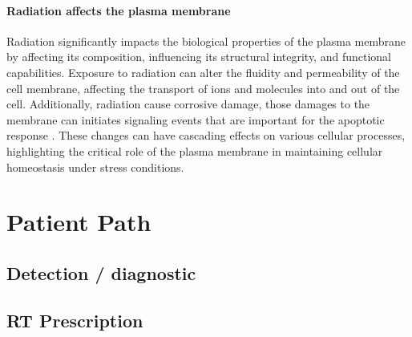 \paragraph{Radiation affects the plasma membrane}
Radiation significantly impacts the biological properties of the plasma membrane by affecting its composition, influencing its structural integrity, and functional capabilities.
Exposure to radiation can alter the fluidity and permeability of the cell membrane, affecting the transport of ions and molecules into and out of the cell.
Additionally, radiation cause corrosive damage, those damages to the membrane can initiates signaling events that are important for the apoptotic response \cite{CohenJonathan1999}.
These changes can have cascading effects on various cellular processes, highlighting the critical role of the plasma membrane in maintaining cellular homeostasis under stress conditions.





\section{Patient Path}

\subsection{Detection / diagnostic}
\subsection{RT Prescription}
